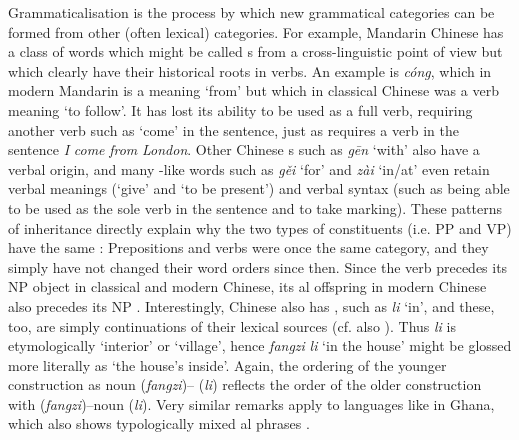 \documentclass[output=paper]{langsci/langscibook}
\begin{document}
Grammaticalisation is the process by which new grammatical categories can be formed from other (often lexical) categories. For example, Mandarin Chinese has a class of words which might be called s from a cross-linguistic point of view but which clearly have their historical roots in verbs. An example is  \textit{cóng}, which in modern Mandarin is a  meaning ‘from’ but which in classical Chinese was a verb meaning ‘to follow’. It has lost its ability to be used as a full verb, requiring another verb such as ‘come’ in the sentence, just as  requires a verb in the sentence \textit{I} \textit{come} \textit{from} \textit{London}. Other Chinese s such as  \textit{gēn} ‘with’ also have a verbal origin, and many -like words such as  \textit{gěi} ‘for’ and  \textit{zài} ‘in/at’ even retain verbal meanings (‘give’ and ‘to be present’) and verbal syntax (such as being able to be used as the sole verb in the sentence and to take  marking). These patterns of inheritance directly explain why the two types of constituents (i.e. PP and VP) have the same : Prepositions and verbs were once the same category, and they simply have not changed their word orders since then. Since the verb precedes its NP object in classical and modern Chinese, its al offspring in modern Chinese also precedes its NP . Interestingly, Chinese also has , such as \textit{li} ‘in’, and these, too, are simply continuations of their lexical sources (cf. also ). Thus \textit{li} is etymologically ‘interior’ or ‘village’, hence \textit{fangzi} \textit{li} ‘in the house’ might be glossed more literally as ‘the house’s inside’. Again, the ordering of the younger construction as noun (\textit{fangzi})– (\textit{li}) reflects the order of the older construction with  (\textit{fangzi})–noun (\textit{li}). Very similar remarks apply to  languages like  in Ghana, which also shows typologically mixed al phrases \citep{Bodomo1997}. 
\end{document}
